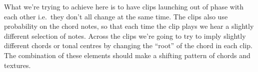 \documentclass[
  12pt,
  letterpaper,
  oneside,
  open=any]{scrbook}
\begin{document}
\begin{tcolorbox}[enhanced jigsaw, arc=.35mm, title=\textcolor{quarto-callout-tip-color}{\faLightbulb}\hspace{0.5em}{Key idea}, colback=white, opacitybacktitle=0.6, coltitle=black, toptitle=1mm, colframe=quarto-callout-tip-color-frame, bottomtitle=1mm, titlerule=0mm, rightrule=.15mm, bottomrule=.15mm, colbacktitle=quarto-callout-tip-color!10!white, toprule=.15mm, breakable, opacityback=0, left=2mm, leftrule=.75mm]

What we're trying to achieve here is to have clips launching out of
phase with each other i.e.~they don't all change at the same time. The
clips also use probability on the chord notes, so that each time the
clip plays we hear a slightly different selection of notes. Across the
clips we're going to try to imply slightly different chords or tonal
centres by changing the ``root'' of the chord in each clip. The
combination of these elements should make a shifting pattern of chords
and textures.

\end{tcolorbox}
\end{document}
